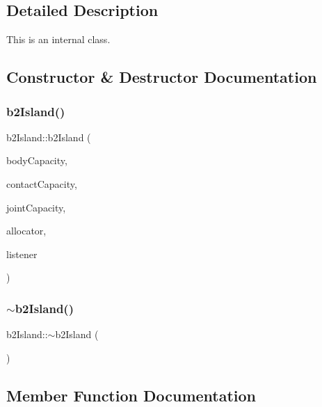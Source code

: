 \subsection{Detailed Description}
This is an internal class. 

\subsection{Constructor \& Destructor Documentation}
\mbox{\label{classb2_island_a2f2258f09d2663dcb35a1d69d16896cb}} 
\subsubsection{\texorpdfstring{b2Island()}{b2Island()}}
{\footnotesize\ttfamily b2\+Island\+::b2\+Island (\begin{DoxyParamCaption}\item[{\mbox{\hyperlink{b2_settings_8h_a43d43196463bde49cb067f5c20ab8481}{int32}}}]{body\+Capacity,  }\item[{\mbox{\hyperlink{b2_settings_8h_a43d43196463bde49cb067f5c20ab8481}{int32}}}]{contact\+Capacity,  }\item[{\mbox{\hyperlink{b2_settings_8h_a43d43196463bde49cb067f5c20ab8481}{int32}}}]{joint\+Capacity,  }\item[{\mbox{\hyperlink{classb2_stack_allocator}{b2\+Stack\+Allocator}} $\ast$}]{allocator,  }\item[{\mbox{\hyperlink{classb2_contact_listener}{b2\+Contact\+Listener}} $\ast$}]{listener }\end{DoxyParamCaption})}

\mbox{\label{classb2_island_a87b39bdaab4f98acca77dd39d157a0e8}} 
\subsubsection{\texorpdfstring{$\sim$b2Island()}{~b2Island()}}
{\footnotesize\ttfamily b2\+Island\+::$\sim$b2\+Island (\begin{DoxyParamCaption}{ }\end{DoxyParamCaption})}



\subsection{Member Function Documentation}
\mbox{\label{classb2_island_af2d54861bd063051c0a6dc5f73b27c3e}} 
